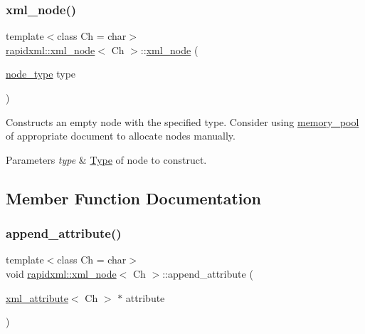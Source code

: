 \subsubsection{\texorpdfstring{xml\+\_\+node()}{xml\_node()}\hspace{0.1cm}{\footnotesize\ttfamily [2/2]}}
{\footnotesize\ttfamily template$<$class Ch = char$>$ \\
\mbox{\hyperlink{classrapidxml_1_1xml__node}{rapidxml\+::xml\+\_\+node}}$<$ Ch $>$\+::\mbox{\hyperlink{classrapidxml_1_1xml__node}{xml\+\_\+node}} (\begin{DoxyParamCaption}\item[{\mbox{\hyperlink{namespacerapidxml_abb456db38f7efb746c4330eed6072a7c}{node\+\_\+type}}}]{type }\end{DoxyParamCaption})\hspace{0.3cm}{\ttfamily [inline]}}

Constructs an empty node with the specified type. Consider using \mbox{\hyperlink{classrapidxml_1_1memory__pool}{memory\+\_\+pool}} of appropriate document to allocate nodes manually. 
\begin{DoxyParams}{Parameters}
{\em type} & \mbox{\hyperlink{class_type}{Type}} of node to construct. \\
\hline
\end{DoxyParams}


\subsection{Member Function Documentation}
\mbox{\label{classrapidxml_1_1xml__node_a33ce3386f8c42dd4db658b75cbb6e6c4}} 
\subsubsection{\texorpdfstring{append\+\_\+attribute()}{append\_attribute()}\hspace{0.1cm}{\footnotesize\ttfamily [1/2]}}
{\footnotesize\ttfamily template$<$class Ch = char$>$ \\
void \mbox{\hyperlink{classrapidxml_1_1xml__node}{rapidxml\+::xml\+\_\+node}}$<$ Ch $>$\+::append\+\_\+attribute (\begin{DoxyParamCaption}\item[{\mbox{\hyperlink{classrapidxml_1_1xml__attribute}{xml\+\_\+attribute}}$<$ Ch $>$ $\ast$}]{attribute }\end{DoxyParamCaption})\hspace{0.3cm}{\ttfamily [inline]}}

